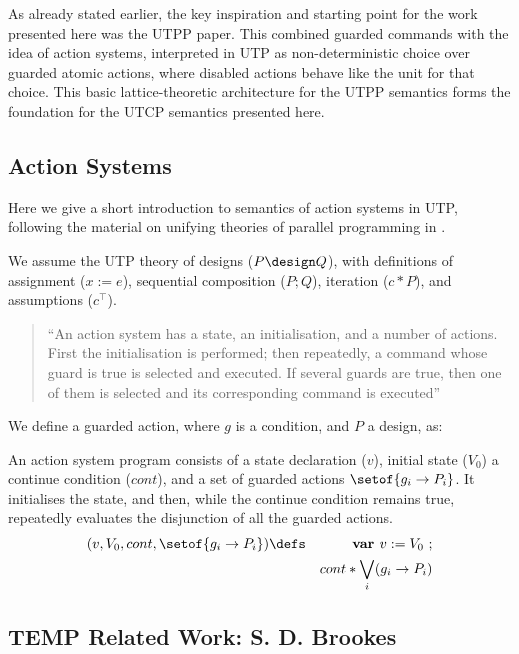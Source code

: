 As already stated earlier,
the key inspiration and starting point for the work presented here
was the UTPP paper\cite{DBLP:conf/icfem/WoodcockH02}.
This combined guarded commands\cite{1976:book:dijkstra}
with the idea of action systems\cite{PODC::BackK1983},
interpreted in UTP as non-deterministic choice
over guarded atomic actions,
where disabled actions behave like the unit for that choice.
This basic lattice-theoretic architecture for the UTPP semantics
forms the foundation for the UTCP semantics presented here.

\subsection{Action Systems}

Here we give a short introduction to semantics of action systems
in UTP, following the material on unifying theories
of parallel programming in \cite{DBLP:conf/icfem/WoodcockH02}.

We assume the UTP theory of designs ($P \design Q$), with definitions
of assignment ($x:=e$),
sequential composition ($P;Q$),
iteration ($c*P$), and assumptions ($c^\top$).

\begin{quote}
``An action system has a state, an initialisation, and a number of actions.
First the initialisation is performed;
then repeatedly, a command whose guard is true is selected and executed.
If several guards are true,
then one of them is selected and its corresponding command is executed''\cite{DBLP:conf/icfem/WoodcockH02}
\end{quote}



We define a guarded action, where $g$ is a condition,
and $P$ a design, as:

An action system program
consists of a state declaration ($v$),
initial state ($V_0$)
a continue condition ($cont$),
and a set of guarded actions $\setof{g_i \rightarrow P_i}$.
It initialises the state,
and then, while the continue condition remains true,
repeatedly evaluates the disjunction of all the guarded actions.
\begin{eqnarray*}
(v,V_0,cont,\setof{g_i \rightarrow P_i})
   &\defs&
   \textbf{var }v := V_0 ~;
\\&& cont * \bigvee_i (g_i \rightarrow P_i)
\end{eqnarray*}


\subsection{TEMP Related Work: S. D. Brookes}

